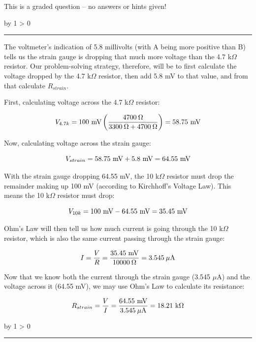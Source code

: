 \documentclass[12pt,a4paper]{article}
\def\oppgave{
            \advance\questnum by 1
            \ifnum \questnum > 0
                 \hrule
                 \vskip 3pt
                 \leftline{Oppgave \the\questnum}
                 \vskip 3pt \fi}
\def\notes{
           \advance\explnum by 1
           \ifnum \explnum > 0
                \hrule
                \vskip 3pt
                \leftline{Notes \the\explnum}
                \vskip 3pt \fi}
\begin{document}
This is a graded question -- no answers or hints given!

\vskip 10pt \filbreak 





\notes{} 

The voltmeter's indication of 5.8 millivolts (with A being more positive than B) tells us the strain gauge is dropping that much more voltage than the 4.7 k$\Omega$ resistor.  Our problem-solving strategy, therefore, will be to first calculate the voltage dropped by the 4.7 k$\Omega$ resistor, then add 5.8 mV to that value, and from that calculate $R_{strain}$.

\vskip 10pt

First, calculating voltage across the 4.7 k$\Omega$ resistor:

$$V_{4.7k} = 100 \hbox{ mV} \left(4700 \> \Omega \over {3300 \> \Omega + 4700 \> \Omega}\right) = 58.75 \hbox{ mV}$$

Now, calculating voltage across the strain gauge:

$$V_{strain} = 58.75 \hbox{ mV} + 5.8 \hbox{ mV} = 64.55 \hbox{ mV}$$

With the strain gauge dropping 64.55 mV, the 10 k$\Omega$ resistor must drop the remainder making up 100 mV (according to Kirchhoff's Voltage Law).  This means the 10 k$\Omega$ resistor must drop:

$$V_{10k} = 100 \hbox{ mV} - 64.55 \hbox{ mV} = 35.45 \hbox{ mV}$$

Ohm's Law will then tell us how much current is going through the 10 k$\Omega$ resistor, which is also the same current passing through the strain gauge:

$$I = {V \over R} = {35.45 \hbox{ mV} \over 10000 \> \Omega} = 3.545 \> \mu\hbox{A}$$

Now that we know both the current through the strain gauge (3.545 $\mu$A) and the voltage across it (64.55 mV), we may use Ohm's Law to calculate its resistance:

$$R_{strain} = {V \over I} = {64.55 \hbox{ mV} \over 3.545 \> \mu\hbox{A}} = 18.21 \hbox{ k}\Omega$$


\vfil \eject 


\oppgave{} 
\end{document}
